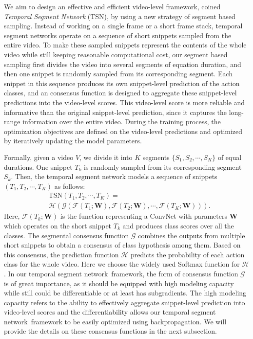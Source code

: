 \documentclass[10pt,journal,compsoc]{IEEEtran}
\newcommand{\SEGNET}{temporal segment network}
\begin{document}
We aim to design an effective and efficient video-level framework, coined \emph{Temporal Segment Network} (TSN), by using a new strategy of segment based sampling. Instead of working on a single frame or a short frame stack, \SEGNET s operate on a sequence of short snippets sampled from the entire video. 
To make these sampled snippets represent the contents of the whole video while still keeping reasonable computational cost, our segment based sampling first divides the video into several segments of equation duration, and then one snippet is randomly sampled from its corresponding segment.
Each snippet in this sequence produces its own snippet-level prediction of the action classes, and an consensus function is designed to aggregate these snippet-level predictions into the video-level scores. This video-level score is more reliable and informative than the original snippet-level prediction, since it captures the long-range information over the entire video.
During the training process, the optimization objectives are defined on the video-level predictions and optimized by iteratively updating the model parameters.


Formally, given a video $V$, we divide it into $K$ segments $\{S_1, S_2, \cdots, S_K\}$ of equal durations. One snippet $ T_k $ is randomly sampled from its corresponding segment $S_k$. Then, the temporal segment network models a sequence of snippets $(T_1, T_2, \cdots, T_K)$  as follows:
\begin{equation}
\begin{split}
& \mathrm{TSN}(T_1, T_2, \cdots, T_K) = \\
& \mathcal{H} (\mathcal{G}(\mathcal{F}(T_1;\mathbf{W}), \mathcal{F}(T_2;\mathbf{W}), \cdots, \mathcal{F}(T_K; \mathbf{W}))).
\label{equ:model}
\end{split}
\end{equation}
Here, $\mathcal{F}(T_k; \mathbf{W})$ is the function representing a ConvNet with parameters $\mathbf{W}$ which operates on the short snippet $T_k$ and produces class scores over all the classes. The segmental consensus function $\mathcal{G}$ combines the outputs from multiple short snippets to obtain a consensus of class hypothesis among them. Based on this consensus, the prediction function $\mathcal{H}$ predicts the probability of each action class for the whole video. Here we choose the widely used Softmax function for $\mathcal{H}$.  In our \SEGNET~framework, the form of consensus function $ \mathcal{G} $ is of great importance, as it should be equipped with high modeling capacity while still could be differentiable or at least has subgradients. The high modeling capacity refers to the ability to effectively aggregate snippet-level prediction into video-level scores and the differentiability allows our \SEGNET~framework to be easily optimized using backpropagation. We will provide the details on these consensus functions in the next subsection.
\end{document}
